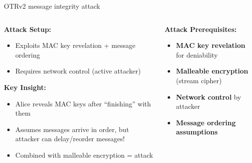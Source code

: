 \documentclass[aspectratio=169, lualatex, handout]{beamer}
\begin{document}
\begin{frame}{OTRv2 message integrity attack}
	\begin{columns}[c]
		\begin{column}{0.5\textwidth}
			\textbf{Attack Setup:}
			\begin{itemize}
				\item Exploits MAC key revelation + message ordering
				\item Requires network control (active attacker)
			\end{itemize}
			\textbf{Key Insight:}
			\begin{itemize}
				\item Alice reveals MAC keys after ``finishing'' with them
				\item Assumes messages arrive in order, but attacker can delay/reorder messages!
				\item Combined with malleable encryption = attack
			\end{itemize}
		\end{column}
		\begin{column}{0.5\textwidth}
			\textbf{Attack Prerequisites:}
			\begin{itemize}
				\item \textbf{MAC key revelation} for deniability
				\item \textbf{Malleable encryption} (stream cipher)
				\item \textbf{Network control} by attacker
				\item \textbf{Message ordering assumptions}
			\end{itemize}
		\end{column}
	\end{columns}
\end{frame}
\end{document}
